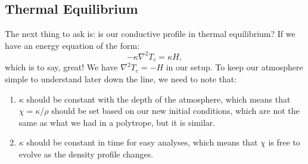 \documentclass[aps, pre, onecolumn, nofootinbib, notitlepage, groupedaddress, amsfonts, amssymb, amsmath, longbibliography]{revtex4-1}
\newcommand{\grad}{\ensuremath{\nabla}}
\begin{document}
\subsection{Thermal Equilibrium}
The next thing to ask is: is our conductive profile in thermal equilibrium?  If we have an energy equation of the
form:
\begin{equation}
-\kappa \grad^2 T_c = \kappa H,
\end{equation}
which is to say, great!  We have $\grad^2 T_c = -H$ in our setup.  To keep our atmosphere simple
to understand later down the line, we need to note that:
\begin{enumerate}
\item $\kappa$ should be constant with the depth of the atmosphere, which means that
$\chi = \kappa/\rho$ should be set based on our new initial conditions, which are not
the same as what we had in a polytrope, but it is similar.
\item $\kappa$ should be constant in time for easy analyses, which means that $\chi$ is free
to evolve as the density profile changes.
\end{enumerate}


\end{document}
